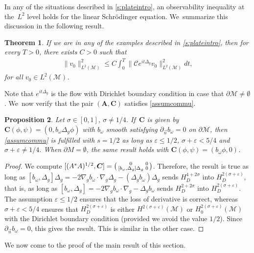 \documentclass[10pt]{amsart}
\newtheorem{theorem}{Theorem}[section]
\newtheorem{proposition}[theorem]{Proposition}
\theoremstyle{definition}
\let\mc\mathcal
\let\veps\varepsilon
\newcommand{\M}{\mc{M}}
\newcommand{\bC}{\boldsymbol{C}}
\newcommand{\bA}{\boldsymbol{A}}
\providecommand{\norm}[1]{\lVert#1\rVert}
\begin{document}
In any of the situations described in \cref{s:plateintro}, an observability inequality at the~$ L^2$ level holds for the linear Schrödinger equation. We~summarize this discussion in the following result.

\begin{theorem}\label{thm:schr-obs}
If we are in any of the examples described in \cref{s:plateintro}, then for every $T>0$, there exists $C>0$ such that
\begin{align*}
\norm{v_0}_{L^2(\M)}^2\leq C\int_0^T \norm{\mc{C} e^{it\Delta_g}v_0}_{L^2(\M)}^2dt,
\end{align*}
for all $v_0\in L^2(\M)$.
\end{theorem}
Note that $e^{it\Delta_g}$ is the flow with Dirichlet boundary condition in case that $\partial \M\neq \emptyset$. We~now verify that the pair $(\bA, \bC)$ satisfies \cref{assumcommu}.
\begin{proposition}\label{propcommutplate}
Let $\sigma\in [0, 1]$, $\sigma \neq 1/4$. If~$\bC$ is given by $ \bC(\phi, \psi)=(0, b_\omega\Delta_g \phi)$ with $b_{\omega}$ smooth satisfying $\partial_{\vec n}b_{\omega}=0$ on $\partial \M$, then \cref{assumcommu} is fulfilled with $s=1/2$ as long as $\veps\leq 1/2$, $\sigma+\veps<5/4$ and $\sigma+\veps\neq 1/4$. When $\partial M=\emptyset$, the same result holds with $ \bC(\phi, \psi)=(b_\omega\phi,0)$.
\end{proposition}
\begin{proof}
We compute $[(A^*A)^{1/2},\bC]=\begin{psmallmatrix}
0 & 0\\
[b_{\omega},\Delta_g] \Delta_g & 0
\end{psmallmatrix}$. Therefore, the result is true as long as $[b_{\omega},\Delta_g]\Delta_g=-2\nabla_g b_{\omega}\cdot \nabla_g \Delta_g-(\Delta_g b_{\omega})\Delta_g$ sends $H^{4+2\sigma}_D$ into $H^{2(\sigma+\veps)}_D$, that is, as long as $[b_{\omega},\Delta_g]=-2\nabla_g b_{\omega}\cdot \nabla_g -\Delta_g b_{\omega}$ sends $H^{2+2\sigma}_D$ into $H^{2(\sigma+\veps)}_D$. The assumption $\veps\leq 1/2$ ensures that the loss of derivative is correct, whereas $\sigma+\veps<5/4$ ensures that $H^{2(\sigma+\veps)}_D$ is either $H^{2(\sigma+\veps)}(\M)$ or $H^{2(\sigma+\veps)}_0(\M)$ with the Dirichlet boundary condition (provided we avoid the value $1/2$). Since $\partial_{\vec n}b_{\omega}=0$, this gives the result. This is similar in the other case.
\end{proof}

We now come to the proof of the main result of this section.
\end{document}
